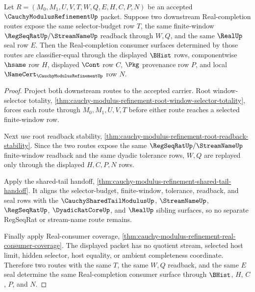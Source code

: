 \begin{theorem}
\label{thm:cauchy-modulus-refinement-selector-budget-regseqrat-real-seal-determinacy}
Let $R=(M_0,M_1,U,V,T,W,Q,E,H,C,P,N)$ be an accepted $\CauchyModulusRefinementUp$ packet. Suppose two downstream Real-completion routes expose the same selector-budget row $T$, the same finite-window $\RegSeqRatUp/\StreamNameUp$ readback through $W,Q$, and the same $\RealUp$ seal row $E$. Then the Real-completion consumer surfaces determined by those routes are classifier-equal through the displayed $\BHist$ rows, componentwise $\hsame$ row $H$, displayed $\Cont$ row $C$, $\Pkg$ provenance row $P$, and local $\NameCert_{\CauchyModulusRefinementUp}$ row $N$.
\end{theorem}
\begin{proof}
Project both downstream routes to the accepted carrier. Root window-selector totality, \autoref{thm:cauchy-modulus-refinement-root-window-selector-totality}, forces each route through $M_0,M_1,U,V,T$ before either route reaches a selected finite-window row.

Next use root readback stability, \autoref{thm:cauchy-modulus-refinement-root-readback-stability}. Since the two routes expose the same $\RegSeqRatUp/\StreamNameUp$ finite-window readback and the same dyadic tolerance rows, $W,Q$ are replayed only through the displayed $H,C,P,N$ rows.

Apply the shared-tail handoff, \autoref{thm:cauchy-modulus-refinement-shared-tail-handoff}. It aligns the selector-budget, finite-window, tolerance, readback, and seal rows with the $\CauchySharedTailModulusUp$, $\StreamNameUp$, $\RegSeqRatUp$, $\DyadicRatCoreUp$, and $\RealUp$ sibling surfaces, so no separate RegSeqRat or stream-name route remains.

Finally apply Real-consumer coverage, \autoref{thm:cauchy-modulus-refinement-real-consumer-coverage}. The displayed packet has no quotient stream, selected host limit, hidden selector, host equality, or ambient completeness coordinate. Therefore two routes with the same $T$, the same $W,Q$ readback, and the same $E$ seal determine the same Real-completion consumer surface through $\BHist$, $H$, $C$, $P$, and $N$.
\end{proof}

